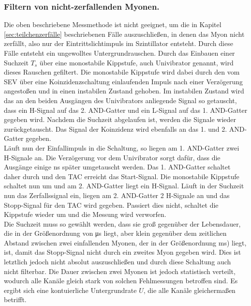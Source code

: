 \documentclass[
  bibliography=totoc,     %
  captions=tableheading,  %
  titlepage=firstiscover, %
]{scrartcl}
\begin{document}
  \subsubsection{Filtern von nicht-zerfallenden Myonen.}
  Die oben beschriebene Messmethode ist nicht geeignet, um die in Kapitel
  \ref{sec:teilchenzerfälle} beschriebenen Fälle auszuschließen, in denen das Myon
  nicht zerfällt, also nur der Eintrittslichtimpuls im Szintillator entsteht.
  Durch diese Fälle entsteht ein ungewolltes Untergrundrauschen. Durch das
  Einbauen einer Suchzeit $T_s$ über eine monostabile
  Kippstufe, auch Univibrator genannt, wird dieses Rauschen gefiltert. Die
  monostabile Kippstufe wird dabei durch den vom SEV über eine Koinzidenzschaltung einlaufenden
  Impuls nach einer Verzögerung angestoßen und in einen instabilen Zustand gehoben.
  Im instabilen Zustand wird das an den beiden Ausgängen des Univibrators anliegende Signal so
  getauscht, dass ein H-Signal auf das 2. AND-Gatter und ein L-Signal auf das 1. AND-Gatter
  gegeben wird. Nachdem die Suchzeit abgelaufen ist, werden die Signale wieder zurückgetauscht.
  Das Signal der Koinzidenz wird ebenfalls an das 1. und 2. AND-Gatter gegeben.\\
  Läuft nun der Einfallimpuls in die Schaltung, so liegen am 1. AND-Gatter zwei
  H-Signale an. Die Verzögerung vor dem Univibrator sorgt dafür, dass die Ausgänge einige
  \si{\nano\second} später umgetauscht werden. Das 1. AND-Gatter schaltet daher durch
  und den TAC erreicht das Start-Signal. Die monostabile Kippstufe schaltet nun um
  und am 2. AND-Gatter liegt ein H-Signal. Läuft in der Suchzeit nun das Zerfallssignal
  ein, liegen am 2. AND-Gatter 2 H-Signale an und das Stopp-Signal für den TAC wird gegeben.
  Passiert dies nicht, schaltet die Kippstufe wieder um und die Messung wird verworfen.\\
  Die Suchzeit muss so gewählt werden, dass sie groß gegenüber der Lebensdauer, die in der Größenordnung
  von \si{\micro\second} liegt, aber klein
  gegenüber dem zeitlichen Abstand zwischen zwei einfallenden Myonen, der in der
  Größenordnung \si{\milli\second}) liegt, ist, damit das
  Stopp-Signal nicht durch ein zweites Myon gegeben wird. Dies ist letztlich jedoch nicht absolut
  auszuschließen und durch diese Schaltung auch nicht filterbar. Die Dauer zwischen
  zwei Myonen ist jedoch statistisch verteilt, wodurch alle Kanäle gleich stark von
  solchen Fehlmessungen betroffen sind. Es ergibt sich eine kontuierliche Untergrundrate $U$,
  die alle Kanäle gleichermaßen betrifft.
\end{document}

